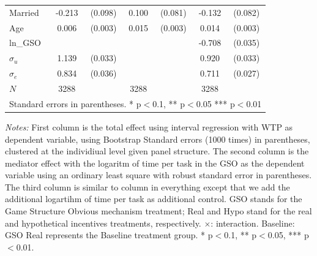 \documentclass[12pt]{article}
\newcommand{\sym}[1]{\rlap{$^{#1}$}}
\begin{document}
\begin{table}[H]
{\begin{tabular}{l*{3}{cc}}
Married     &      -0.213\sym{**} &     (0.098)&       0.100         &     (0.081)&      -0.132         &     (0.082)\\
Age         &       0.006\sym{*}  &     (0.003)&       0.015\sym{***}&     (0.003)&       0.014\sym{***}&     (0.003)\\
ln\_GSO      &                     &            &                     &            &      -0.708\sym{***}&     (0.035)\\
$\sigma_u $    &       1.139\sym{***}&     (0.033)&                     &            &       0.920\sym{***}&     (0.033)\\
$\sigma_e $    &       0.834\sym{***}&     (0.036)&                     &            &       0.711\sym{***}&     (0.027)\\
\hline
\(N\)       &        3288         &            &        3288         &            &        3288         &            \\
\hline\hline
\multicolumn{7}{l}{\footnotesize Standard errors in parentheses. * p$<$0.1, ** p$<$0.05 *** p$<$0.01}\\
\end{tabular}
}






\begin{tablenotes}
            \footnotesize
          \item \textit{Notes:} First column is the total effect using interval regression with WTP as dependent variable, using  Bootstrap Standard errors (1000 times) in parentheses, clustered at the individiual level given panel structure. The second column is the mediator effect with the logaritm of time per task in the GSO as the dependent variable using an ordinary least square with robust standard error in parentheses. The third column is similar to column in everything except that we add the additional logartihm of time per task as additional control. GSO stands for the Game Structure Obvious mechanism treatment; Real and Hypo stand for the real and hypothetical incentives treatments, respectively.  $\times$: interaction. Baseline: GSO Real represents the Baseline treatment group. * p$<$0.1, ** p$<$0.05, *** p$<$0.01.
        \end{tablenotes}
\end{table}

\clearpage
\end{document}
